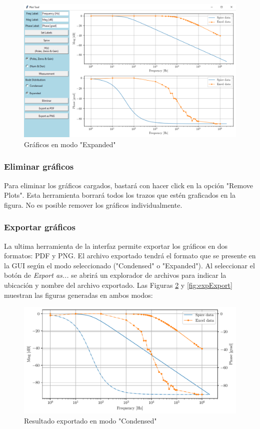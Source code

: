 \begin{figure}[ht]
\centering
\includegraphics[scale=0.15]{resources/expanded.png}
\caption{Gráficos en modo "Expanded"}
\label{fig:expanded}
\end{figure}

\subsubsection{Eliminar gráficos}
Para eliminar los gráficos cargados, bastará con hacer click en la opción "Remove Plots". Esta herramienta borrará todos los trazos que estén graficados en la figura. No es posible remover los gráficos individualmente.

\subsubsection{Exportar gráficos}
La ultima herramienta de la interfaz permite exportar los gráficos en dos formatos: PDF y PNG. El archivo exportado tendrá el formato que se presente en la GUI según el modo seleccionado ("Condensed" o "Expanded"). Al seleccionar el botón de \emph{Export as...} se abrirá un explorador de archivos para indicar la ubicación y nombre del archivo exportado. Las Figuras \ref{fig:condExport} y \ref{fig:expExport} muestran las figuras generadas en ambos modos:

\begin{figure}[ht]
\centering
\includegraphics[scale=0.7]{resources/condExport.pdf}
\caption{Resultado exportado en modo "Condensed"}
\label{fig:condExport}
\end{figure}

